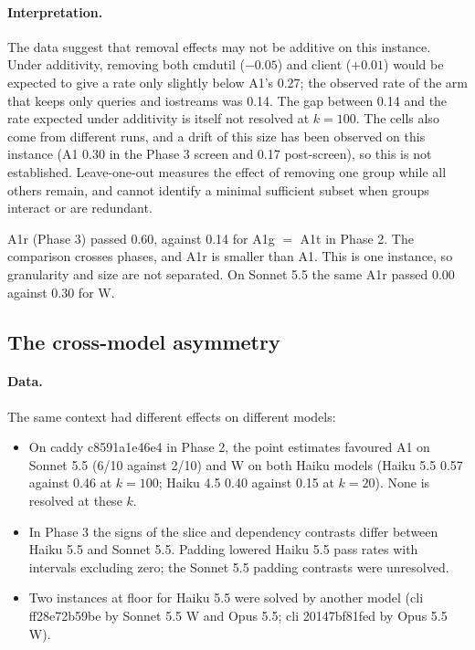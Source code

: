 \paragraph{Interpretation.} The data suggest that removal effects may not be additive on this instance. Under additivity, removing both cmdutil ($-0.05$) and client ($+0.01$) would be expected to give a rate only slightly below A1's 0.27; the observed rate of the arm that keeps only queries and iostreams was 0.14. The gap between 0.14 and the rate expected under additivity is itself not resolved at $k=100$. The cells also come from different runs, and a drift of this size has been observed on this instance (A1 0.30 in the Phase 3 screen and 0.17 post-screen), so this is not established. Leave-one-out measures the effect of removing one group while all others remain, and cannot identify a minimal sufficient subset when groups interact or are redundant.

A1r (Phase 3) passed 0.60, against 0.14 for A1g $=$ A1t in Phase 2. The comparison crosses phases, and A1r is smaller than A1. This is one instance, so granularity and size are not separated. On Sonnet 5.5 the same A1r passed 0.00 against 0.30 for W.

\subsection{The cross-model asymmetry}

\paragraph{Data.} The same context had different effects on different models:
\begin{itemize}
\item On caddy c8591a1e46e4 in Phase 2, the point estimates favoured A1 on Sonnet 5.5 (6/10 against 2/10) and W on both Haiku models (Haiku 5.5 0.57 against 0.46 at $k=100$; Haiku 4.5 0.40 against 0.15 at $k=20$). None is resolved at these $k$.
\item In Phase 3 the signs of the slice and dependency contrasts differ between Haiku 5.5 and Sonnet 5.5. Padding lowered Haiku 5.5 pass rates with intervals excluding zero; the Sonnet 5.5 padding contrasts were unresolved.
\item Two instances at floor for Haiku 5.5 were solved by another model (cli ff28e72b59be by Sonnet 5.5 W and Opus 5.5; cli 20147bf81fed by Opus 5.5 W).
\end{itemize}

